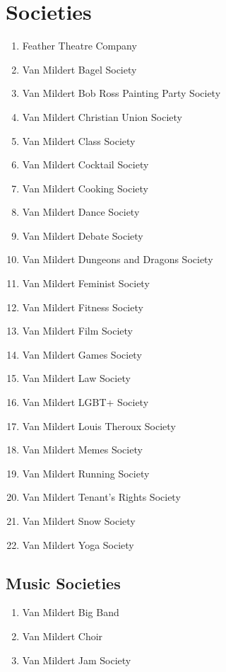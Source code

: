 \documentclass[12pt]{article}  %
\begin{document}
\section{Societies}
\begin{enumerate}[]
    \item Feather Theatre Company
    \item Van Mildert Bagel Society
    \item Van Mildert Bob Ross Painting Party Society
    \item Van Mildert Christian Union Society
    \item Van Mildert Class Society
    \item Van Mildert Cocktail Society
    \item Van Mildert Cooking Society
    \item Van Mildert Dance Society
    \item Van Mildert Debate Society
    \item Van Mildert Dungeons and Dragons Society
    \item Van Mildert Feminist Society
    \item Van Mildert Fitness Society
    \item Van Mildert Film Society
    \item Van Mildert Games Society
    \item Van Mildert Law Society
    \item Van Mildert LGBT+ Society
    \item Van Mildert Louis Theroux Society
    \item Van Mildert Memes Society
    \item Van Mildert Running Society
    \item Van Mildert Tenant’s Rights Society
    \item Van Mildert Snow Society
    \item Van Mildert Yoga Society
\end{enumerate}
\subsection{Music Societies}
\begin{enumerate}[]
    \item Van Mildert Big Band
    \item Van Mildert Choir
    \item Van Mildert Jam Society
\end{enumerate}
\end{document}
